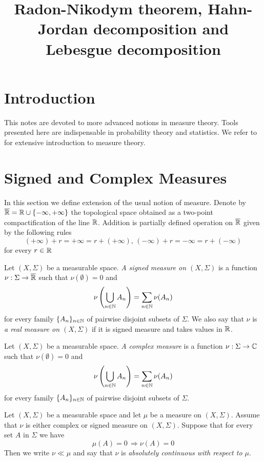 



\title{Radon-Nikodym theorem, Hahn-Jordan decomposition and Lebesgue decomposition}
\date{}
\maketitle

\section{Introduction}
\noindent
This notes are devoted to more advanced notions in measure theory. Tools presented here are indispensable in probability theory and statistics. We refer to \cite{Introductiontomeasuretheory} for extensive introduction to measure theory. 

\section{Signed and Complex Measures}
\noindent
In this section we define extension of the usual notion of measure. Denote by $\overline{{\mathbb R}}={\mathbb R}\cup \{-\infty,+\infty\}$ the topological space obtained as a two-point compactification of the line ${\mathbb R}$. Addition is partially defined operation on $\overline{{\mathbb R}}$ given by the following rules
$$(+\infty)+r=+\infty=r+(+\infty),\,(-\infty)+r=-\infty=r+(-\infty)$$
for every $r\in {\mathbb R}$

\begin{definition}
Let $\left(X,\Sigma\right)$ be a measurable space. \textit{A signed measure on $(X,\Sigma)$} is a function $\nu:\Sigma\rightarrow \overline{{\mathbb R}}$ such that $\nu(\emptyset)=0$ and 
$$\nu\left(\bigcup_{n\in {\mathbb N}}A_n\right)=\sum_{n\in {\mathbb N}}\nu(A_n)$$
for every family $\{A_n\}_{n\in {\mathbb N}}$ of pairwise disjoint subsets of $\Sigma$. We also say that $\nu$ is \textit{a real measure on $(X,\Sigma)$} if it is signed measure and takes values in ${\mathbb R}$.
\end{definition}

\begin{definition}
Let $\left(X,\Sigma\right)$ be a measurable space. \textit{A complex measure} is a function $\nu:\Sigma\rightarrow {\mathbb C}$ such that $\nu(\emptyset)=0$ and 
$$\nu\left(\bigcup_{n\in {\mathbb N}}A_n\right)=\sum_{n\in {\mathbb N}}\nu(A_n)$$
for every family $\{A_n\}_{n\in {\mathbb N}}$ of pairwise disjoint subsets of $\Sigma$. 
\end{definition}

\begin{definition}
Let $(X,\Sigma)$ be a measurable space and let $\mu$ be a measure on $(X,\Sigma)$. Assume that $\nu$ is either complex or signed measure on $(X,\Sigma)$. Suppose that for every set $A$ in $\Sigma$ we have
$$\mu(A) = 0\,\Rightarrow \nu(A)=0$$
Then we write $\nu \ll \mu$ and say that $\nu$ is \textit{absolutely continuous with respect to $\mu$}.
\end{definition}

